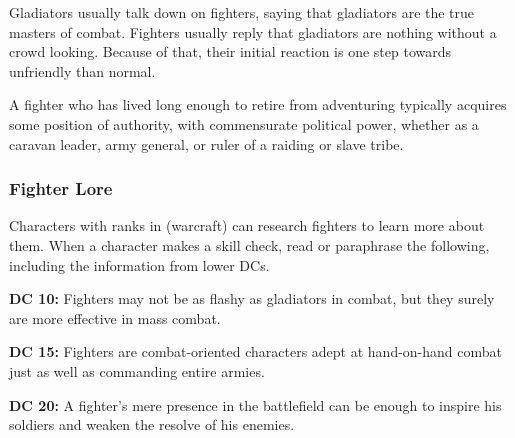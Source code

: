 Gladiators usually talk down on fighters, saying that gladiators are the true masters of combat. Fighters usually reply that gladiators are nothing without a crowd looking. Because of that, their initial reaction is one step towards unfriendly than normal.

A fighter who has lived long enough to retire from adventuring typically acquires some position of authority, with commensurate political power, whether as a caravan leader, army general, or ruler of a raiding or slave tribe.

\subsubsection{Fighter Lore}
Characters with ranks in  (warcraft) can research fighters to learn more about them. When a character makes a skill check, read or paraphrase the following, including the information from lower DCs.

\textbf{DC 10:} Fighters may not be as flashy as gladiators in combat, but they surely are more effective in mass combat.

\textbf{DC 15:} Fighters are combat-oriented characters adept at hand-on-hand combat just as well as commanding entire armies.

\textbf{DC 20:} A fighter's mere presence in the battlefield can be enough to inspire his soldiers and weaken the resolve of his enemies.
